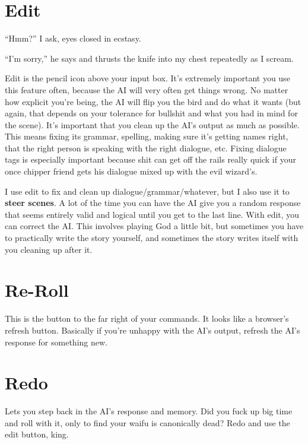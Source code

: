 \documentclass[Avsfag-main.tex]{subfiles}
\begin{document}
\section{Edit}

\begin{storyb}
``Hmm?'' I ask, eyes closed in ecstasy.

``I'm sorry,'' he says and thrusts the knife into my chest repeatedly as I scream.
\end{storyb}

Edit is the pencil icon above your input box.
It's extremely important you use this feature often, because the AI will very often get things wrong.
No matter how explicit you're being, the AI will flip you the bird and do what it wants (but again, that depends on your tolerance for bullshit and what you had in mind for the scene).
It's important that you clean up the AI's output as much as possible.
This means fixing its grammar, spelling, making sure it's getting names right, that the right person is speaking with the right dialogue, etc.
Fixing dialogue tags is especially important because shit can get off the rails really quick if your once chipper friend gets his dialogue mixed up with the evil wizard's.

I use edit to fix and clean up dialogue/grammar/whatever, but I also use it to \textbf{steer scenes}.
A lot of the time you can have the AI give you a random response that seems entirely valid and logical until you get to the last line.
With edit, you can correct the AI.
This involves playing God a little bit, but sometimes you have to practically write the story yourself, and sometimes the story writes itself with you cleaning up after it.

\section{Re-Roll}

This is the button to the far right of your commands.
It looks like a browser's refresh button.
Basically if you're unhappy with the AI's output, refresh the AI's response for something new.

\section{Redo}

Lets you step back in the AI's response and memory.
Did you fuck up big time and roll with it, only to find your waifu is canonically dead?
Redo and use the edit button, king.
\end{document}
